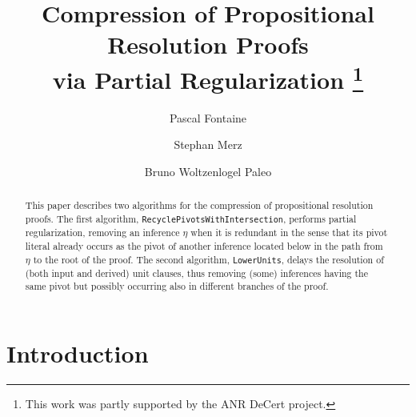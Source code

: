 \documentclass[envcountsame]{llncs}
\title{
  Compression of Propositional Resolution Proofs \\
  via Partial Regularization%
  \thanks{This work was partly supported by the ANR DeCert project.}
}
\author{
  Pascal Fontaine%
  \and Stephan Merz%
  \and Bruno Woltzenlogel Paleo%
}
\institute{
  University of Nancy and INRIA, Nancy, France \\
  \{\email{Pascal.Fontaine,Stephan.Merz,Bruno.WoltzenlogelPaleo}\}\email{@inria.fr}
}
\newcommand{\RPIlong}{\texttt{Recycle\-Pivots\-With\-Intersection}}
\newcommand{\LUlong}{\texttt{Lower\-Units}}
\begin{document}
\maketitle

\begin{abstract}
This paper describes two algorithms for the compression of propositional
resolution proofs. The first algorithm, \RPIlong, performs partial
regularization, removing an inference $\eta$ when it is redundant in the sense
that its pivot literal already occurs as the pivot of another inference located below in the path from $\eta$ to the root of the proof. The second algorithm, \LUlong, delays the resolution of (both input and derived) unit clauses, thus removing (some) inferences having the same pivot but possibly occurring also in different branches of the proof.

\end{abstract}


\section{Introduction}
\end{document}
